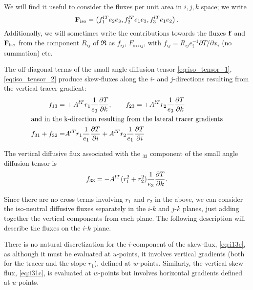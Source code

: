 \documentclass[../tex_main/NEMO_manual]{subfiles}
\begin{document}
We will find it useful to consider the fluxes per unit area in $i,j,k$
space; we write
\begin{equation}
  \label{eq:Fijk}
  \mathbf{F}_{\mathrm{iso}}=\left(f_1^{lT}e_2e_3, f_2^{lT}e_1e_3, f_3^{lT}e_1e_2\right).
\end{equation}
Additionally, we will sometimes write the contributions towards the
fluxes $\mathbf{f}$ and $\mathbf{F}_{\mathrm{iso}}$ from the component
$R_{ij}$ of $\Re$ as $f_{ij}$, $F_{\mathrm{iso}\: ij}$, with
$f_{ij}=R_{ij}e_i^{-1}\partial T/\partial x_i$ (no summation) etc.

The off-diagonal terms of the small angle diffusion tensor
\autoref{eq:iso_tensor_1}, \autoref{eq:iso_tensor_2} produce skew-fluxes along the
$i$- and $j$-directions resulting from the vertical tracer gradient:
\begin{align}
  \label{eq:i13c}
  f_{13}=&+{A^{lT}} r_1\frac{1}{e_3}\frac{\partial T}{\partial k},\qquad f_{23}=+{A^{lT}} r_2\frac{1}{e_3}\frac{\partial T}{\partial k}\\
\intertext{and in the k-direction resulting from the lateral tracer gradients}
  \label{eq:i31c}
 f_{31}+f_{32}=& {A^{lT}} r_1\frac{1}{e_1}\frac{\partial T}{\partial i}+{A^{lT}} r_2\frac{1}{e_1}\frac{\partial T}{\partial i}
\end{align}

The vertical diffusive flux associated with the $_{33}$
component of the small angle diffusion tensor is
\begin{equation}
  \label{eq:i33c}
  f_{33}=-{A^{lT}}(r_1^2 +r_2^2) \frac{1}{e_3}\frac{\partial T}{\partial k}.
\end{equation}

Since there are no cross terms involving $r_1$ and $r_2$ in the above, we can
consider the iso-neutral diffusive fluxes separately in the $i$-$k$ and $j$-$k$
planes, just adding together the vertical components from each
plane. The following description will describe the fluxes on the $i$-$k$
plane.

There is no natural discretization for the $i$-component of the
skew-flux, \autoref{eq:i13c}, as
although it must be evaluated at $u$-points, it involves vertical
gradients (both for the tracer and the slope $r_1$), defined at
$w$-points. Similarly, the vertical skew flux, \autoref{eq:i31c}, is evaluated at
$w$-points but involves horizontal gradients defined at $u$-points.
\end{document}
